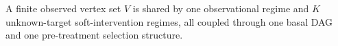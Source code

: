 A finite observed vertex set \(V\) is shared by one observational regime and \(K\) unknown-target soft-intervention regimes, all coupled through one basal DAG and one pre-treatment selection structure.